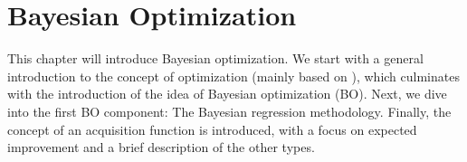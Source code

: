 \chapter{Bayesian Optimization}
This chapter will introduce Bayesian optimization. We start with a general introduction to the
concept of optimization (mainly based on \cite{bayesoptbook}), which culminates with the
introduction of the idea of Bayesian optimization (BO). Next, we dive into the first BO component:
The Bayesian regression methodology. Finally, the concept of an acquisition function is introduced,
with a focus on expected improvement and a brief description of the other types. 





